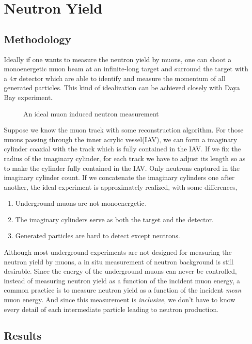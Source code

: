 \chapter{Neutron Yield}

\section{Methodology}

Ideally if one wants to measure the neutron yield by muons, one can shoot a monoenergetic muon beam at an infinite-long target and surround the target with a $4\pi$ detector which are able to identify and measure the momentum of all generated particles. This kind of idealization can be achieved closely with Daya Bay experiment.

\begin{figure}
\centering
{}
\caption{An ideal muon induced neutron measurement} \label{fig:IdealMuN}
\end{figure}

Suppose we know the muon track with some reconstruction algorithm. For those muons passing through the inner acrylic vessel(IAV), we can form a imaginary cylinder coaxial with the track which is fully contained in the IAV. If we fix the radius of the imaginary cylinder, for each track we have to adjust its length so as to make the cylinder fully contained in the IAV. Only neutrons captured in the imaginary cylinder count. If we concatenate the imaginary cylinders one after another, the ideal experiment is approximately realized, with some differences,
\begin{enumerate}
	\item Underground muons are not monoenergetic.
	\item The imaginary cylinders serve as both the target and the detector.
	\item Generated particles are hard to detect except neutrons.
\end{enumerate}

Although most underground experiments are not designed for measuring the neutron yield by muons, a in situ measurement of neutron background is still desirable. Since the energy of the underground muons can never be controlled, instead of measuring neutron yield as a function of the incident muon energy, a common practice is to measure neutron yield as a function of the incident \emph{mean} muon energy. And since this measurement is \emph{inclusive}, we don't have to know every detail of each intermediate particle leading to neutron production.

\section{Results}